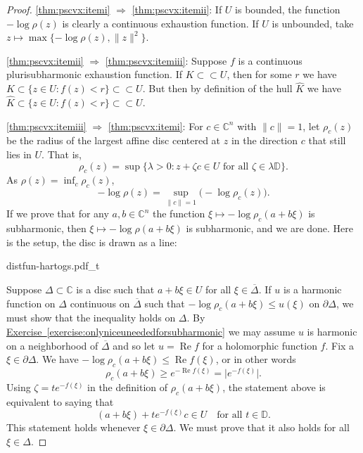 \documentclass[12pt,openany]{book}
\renewcommand{\Re}{\operatorname{Re}}
\newcommand{\snorm}[1]{\lVert {#1} \rVert}
\newcommand{\babs}[1]{\bigl\lvert {#1} \bigr\rvert}
\newcommand{\C}{{\mathbb{C}}}
\newcommand{\D}{{\mathbb{D}}}
\theoremstyle{plain}
\theoremstyle{remark}
\theoremstyle{definition}
\newenvironment{myfig}{%
    \begin{center}
}{%
    \end{center}
}
\theoremstyle{exercise}
\theoremstyle{example}
\newcommand{\exerciseref}[1]{\hyperref[#1]{Exercise~\ref*{#1}}}
\begin{document}
\begin{proof}
\ref{thm:pscvx:itemi}
$\Rightarrow$
\ref{thm:pscvx:itemii}:
If $U$ is bounded,
the function $-\log \rho(z)$ is clearly a continuous exhaustion function.
If $U$ is unbounded, take 
$z \mapsto \max \{ -\log \rho(z) , \snorm{z}^2 \}$.

\ref{thm:pscvx:itemii}
$\Rightarrow$
\ref{thm:pscvx:itemiii}:
Suppose $f$ is a continuous plurisubharmonic exhaustion function.
If $K \subset \subset U$, then for some $r$ we have
$K \subset \{ z \in U : f(z) < r \} \subset \subset U$.
But then by definition of the hull $\widehat{K}$ we have
$\widehat{K} \subset \{ z \in U : f(z) < r \} \subset \subset U$.

\ref{thm:pscvx:itemiii}
$\Rightarrow$
\ref{thm:pscvx:itemi}:
For $c \in \C^n$ with $\snorm{c}=1$, let
$\rho_c(z)$ be the radius of the largest affine disc centered at $z$
in the direction $c$ that still lies in $U$.  That is,
\begin{equation*}
\rho_c(z) =
\sup \bigl\{ \lambda > 0 :
z+ \zeta c \in U \text{ for all $\zeta \in \lambda\D$} \bigr\} .
\end{equation*}
As $\rho(z) = \inf_c \rho_c(z)$,
\begin{equation*}
- \log \rho(z) = \sup_{\snorm{c}=1} \bigl(-\log \rho_c(z)\bigr) .
\end{equation*}
If we prove that for any $a, b \in \C^n$ the function $\xi \mapsto -\log \rho_c(a+b\xi)$ is
subharmonic, then $\xi \mapsto - \log \rho(a+b\xi)$ is subharmonic,
and we are done.
Here is the setup, the disc is drawn as a line:
\begin{myfig}
{distfun-hartogs.pdf_t}
\end{myfig}

Suppose $\Delta \subset \C$ is a disc such that
$a+b\xi \in U$
for all $\xi \in
\overline{\Delta}$.
If $u$ is a harmonic function on $\Delta$ continuous on $\overline{\Delta}$
such that
$- \log \rho_c(a+b\xi) \leq u(\xi)$ on $\partial \Delta$, we must
show that 
the inequality holds on $\Delta$.
By \exerciseref{exercise:onlyniceuneededforsubharmonic}
we may assume $u$ is harmonic on a neighborhood of $\overline{\Delta}$
and so let $u = \Re f$ for a holomorphic function $f$.
Fix a $\xi \in \partial \Delta$.  We have  $- \log \rho_c(a+b\xi) \leq \Re
f(\xi)$,
or in other words
\begin{equation*}
\rho_c(a+b\xi) \geq e^{-\Re f(\xi)} = \babs{e^{-f(\xi)}}.
\end{equation*}
Using $\zeta = t e^{-f(\xi)}$ in the definition of $\rho_c(a+b\xi)$, the statement above is equivalent
to saying that 
\begin{equation*}
(a+b\xi)+te^{-f(\xi)}c \in U \quad \text{for all $t \in \D$}.
\end{equation*}
This statement holds whenever $\xi \in \partial \Delta$.  We must prove that
it also holds for all $\xi \in \Delta$.


\end{proof}
\end{document}
